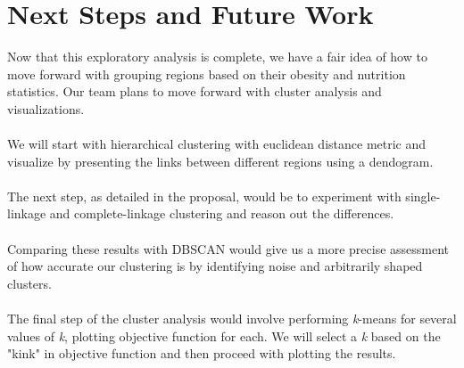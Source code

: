 \documentclass{article}
\begin{document}
	\section{Next Steps and Future Work}
		\label{futurework}
		Now that this exploratory analysis is complete, we have a fair idea of how to move forward with grouping regions based on their obesity and nutrition statistics. Our team plans to move forward with cluster analysis and visualizations. 
		\\\\
		We will start with hierarchical clustering with euclidean distance metric and visualize by presenting the links between different regions using a dendogram.
		\\\\
		The next step, as detailed in the proposal, would be to experiment with single-linkage and complete-linkage clustering and reason out the differences.
		\\\\
		Comparing these results with DBSCAN would give us a more precise assessment of how accurate our clustering is by identifying noise and arbitrarily shaped clusters.
		\\\\
		The final step of the cluster analysis would involve performing \textit{k}-means for several values of \textit{k}, plotting objective function for each. We will select a \textit{k} based on the "kink" in objective function and then proceed with plotting the results.
		
		
		
	
	
	
\end{document}
